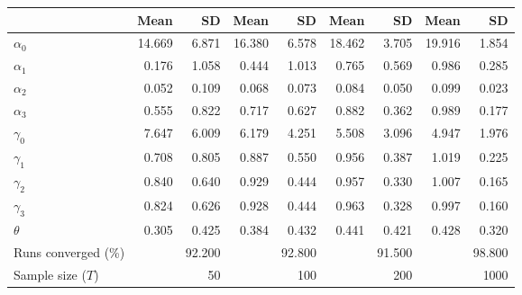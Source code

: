 
\begin{tabular}[t]{lrrrrrrrr}
\toprule
  & Mean & SD & Mean  & SD  & Mean   & SD   & Mean    & SD   \\
\midrule
$\alpha_{0}$ & 14.669 & 6.871 & 16.380 & 6.578 & 18.462 & 3.705 & 19.916 & 1.854\\
$\alpha_{1}$ & 0.176 & 1.058 & 0.444 & 1.013 & 0.765 & 0.569 & 0.986 & 0.285\\
$\alpha_{2}$ & 0.052 & 0.109 & 0.068 & 0.073 & 0.084 & 0.050 & 0.099 & 0.023\\
$\alpha_{3}$ & 0.555 & 0.822 & 0.717 & 0.627 & 0.882 & 0.362 & 0.989 & 0.177\\
$\gamma_{0}$ & 7.647 & 6.009 & 6.179 & 4.251 & 5.508 & 3.096 & 4.947 & 1.976\\
$\gamma_{1}$ & 0.708 & 0.805 & 0.887 & 0.550 & 0.956 & 0.387 & 1.019 & 0.225\\
$\gamma_{2}$ & 0.840 & 0.640 & 0.929 & 0.444 & 0.957 & 0.330 & 1.007 & 0.165\\
$\gamma_{3}$ & 0.824 & 0.626 & 0.928 & 0.444 & 0.963 & 0.328 & 0.997 & 0.160\\
$\theta$ & 0.305 & 0.425 & 0.384 & 0.432 & 0.441 & 0.421 & 0.428 & 0.320\\
Runs converged (\%) &  & 92.200 &  & 92.800 &  & 91.500 &  & 98.800\\
Sample size ($T$) &  & 50 &  & 100 &  & 200 &  & 1000\\
\bottomrule
\end{tabular}
